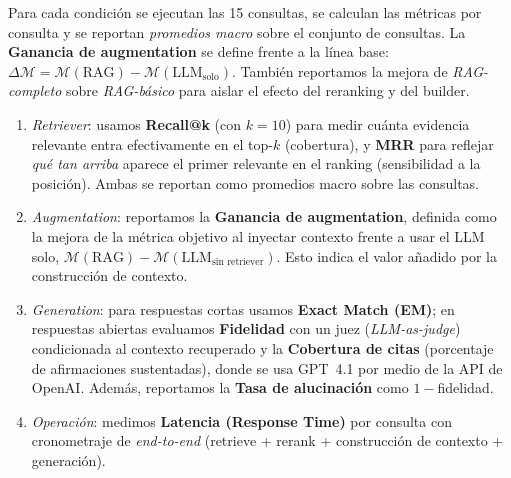 \vspace{0.4em}
\noindent Para cada condición se ejecutan las 15 consultas, se calculan las métricas por consulta y se reportan
\emph{promedios macro} sobre el conjunto de consultas.
La \textbf{Ganancia de augmentation} se define frente a la línea base:
\(\Delta\mathcal{M}=\mathcal{M}(\text{RAG})-\mathcal{M}(\text{LLM}_{\text{solo}})\).
También reportamos la mejora de \emph{RAG-completo} sobre \emph{RAG-básico} para aislar el efecto del reranking y del
builder.

\begin{enumerate}[label=\textbf{(\roman*)},leftmargin=*,itemsep=0.35em]
    \item \textit{Retriever}: usamos \textbf{Recall@k} (con \(k=10\)) para medir cuánta evidencia relevante entra
    efectivamente en el top-\(k\) (cobertura), y \textbf{MRR} para reflejar \emph{qué tan arriba} aparece el primer
    relevante en el ranking (sensibilidad a la posición).
    Ambas se reportan como promedios macro sobre las consultas.

    \item \textit{Augmentation}: reportamos la \textbf{Ganancia de augmentation}, definida como la mejora de la métrica
    objetivo al inyectar contexto frente a usar el LLM solo,
    \(\mathcal{M}(\text{RAG})-\mathcal{M}(\text{LLM}_{\text{sin retriever}})\).
    Esto indica el valor añadido por la construcción de contexto.
    \item \textit{Generation}: para respuestas cortas usamos \textbf{Exact Match (EM)}; en respuestas abiertas evaluamos
    \textbf{Fidelidad} con un juez (\emph{LLM-as-judge}) condicionada al contexto recuperado y la
    \textbf{Cobertura de citas} (porcentaje de afirmaciones sustentadas), donde se usa GPT~4.1 por medio de la API de OpenAI.
    Además, reportamos la \textbf{Tasa de alucinación} como \(1-\)fidelidad.

    \item \textit{Operación}: medimos \textbf{Latencia (Response Time)} por consulta con cronometraje de \emph{end-to-end}
    (retrieve + rerank + construcción de contexto + generación).
\end{enumerate}



